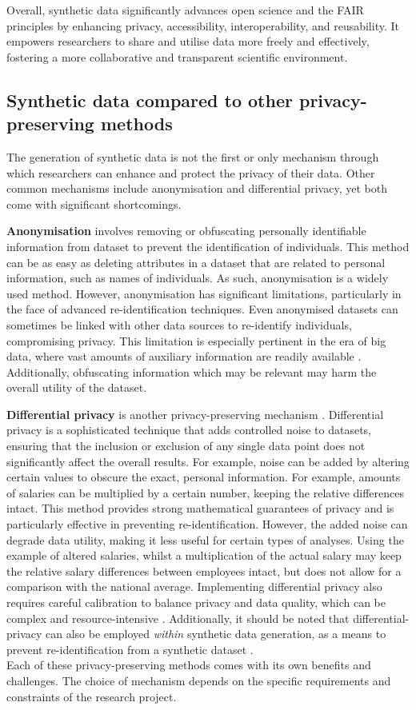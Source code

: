 Overall, synthetic data significantly advances open science and the FAIR principles by enhancing privacy, accessibility, interoperability, and reusability. It empowers researchers to share and utilise data more freely and effectively, fostering a more collaborative and transparent scientific environment. 

\subsection{Synthetic data compared to other privacy-preserving methods}
The generation of synthetic data is not the first or only mechanism through which researchers can enhance and protect the privacy of their data. Other common mechanisms include anonymisation and differential privacy, yet both come with significant shortcomings.

\textbf{Anonymisation} involves removing or obfuscating personally identifiable information from dataset to prevent the identification of individuals. This method can be as easy as deleting attributes in a dataset that are related to personal information, such as names of individuals. As such, anonymisation is a widely used method. However, anonymisation has significant limitations, particularly in the face of advanced re-identification techniques. Even anonymised datasets can sometimes be linked with other data sources to re-identify individuals, compromising privacy. This limitation is especially pertinent in the era of big data, where vast amounts of auxiliary information are readily available \cite{majeed2020anonymization}. Additionally, obfuscating information which may be relevant may harm the overall utility of the dataset.

\textbf{Differential privacy} is another privacy-preserving mechanism \cite{dwork2006differential}. Differential privacy is a sophisticated technique that adds controlled noise to datasets, ensuring that the inclusion or exclusion of any single data point does not significantly affect the overall results. For example, noise can be added by altering certain values to obscure the exact, personal information. For example, amounts of salaries can be multiplied by a certain number, keeping the relative differences intact. This method provides strong mathematical guarantees of privacy and is particularly effective in preventing re-identification. However, the added noise can degrade data utility, making it less useful for certain types of analyses. Using the example of altered salaries, whilst a multiplication of the actual salary may keep the relative salary differences between employees intact, but does not allow for a comparison with the national average. Implementing differential privacy also requires careful calibration to balance privacy and data quality, which can be complex and resource-intensive \cite{wasserman2010statistical,wood2018differential}. Additionally, it should be noted that differential-privacy can also be employed \textit{within} synthetic data generation, as a means to prevent re-identification from a synthetic dataset \cite{jordon2018pate,xin2022federated,sun2023generating}. \\


Each of these privacy-preserving methods comes with its own benefits and challenges. The choice of mechanism depends on the specific requirements and constraints of the research project.